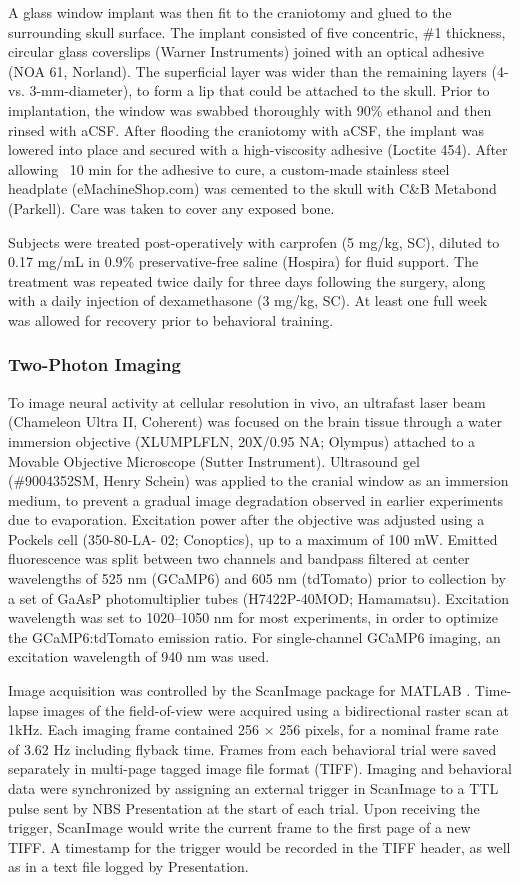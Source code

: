 {A glass window implant was then fit to the craniotomy and glued to the surrounding skull surface. The implant consisted of five concentric, \#1 thickness, circular glass coverslips (Warner Instruments) joined with an optical adhesive (NOA 61, Norland). The superficial layer was wider than the remaining layers (4- vs. 3-mm-diameter), to form a lip that could be attached to the skull. Prior to implantation, the window was swabbed thoroughly with 90\% ethanol and then rinsed with aCSF. After flooding the craniotomy with aCSF, the implant was lowered into place and secured with a high-viscosity adhesive (Loctite 454). After allowing ~10 min for the adhesive to cure, a custom-made stainless steel headplate (eMachineShop.com) was cemented to the skull with C\&B Metabond (Parkell). Care was taken to cover any exposed bone.

Subjects were treated post-operatively with carprofen (5 mg/kg, SC), diluted to 0.17 mg/mL in 0.9\% preservative-free saline (Hospira) for fluid support. The treatment was repeated twice daily for three days following the surgery, along with a daily injection of dexamethasone (3 mg/kg, SC). At least one full week was allowed for recovery prior to behavioral training.

\subsubsection*{Two-Photon Imaging}
To image neural activity at cellular resolution in vivo, an ultrafast laser beam (Chameleon Ultra II, Coherent) was focused on the brain tissue through a water immersion objective (XLUMPLFLN, 20X/0.95 NA; Olympus) attached to a Movable Objective Microscope (Sutter Instrument). Ultrasound gel (\#9004352SM, Henry Schein) was applied to the cranial window as an immersion medium, to prevent a gradual image degradation observed in earlier experiments due to evaporation.
Excitation power after the objective was adjusted using a Pockels cell (350-80-LA-
02; Conoptics), up to a maximum of 100 mW. Emitted fluorescence was split between two channels and bandpass filtered at center wavelengths of 525 nm (GCaMP6) and 605 nm (tdTomato) prior to collection by a set of GaAsP photomultiplier tubes (H7422P-40MOD; Hamamatsu). Excitation wavelength was set to 1020--1050 nm for most experiments, in order to optimize the GCaMP6:tdTomato emission ratio. For single-channel GCaMP6 imaging, an excitation wavelength of 940 nm was used.

Image acquisition was controlled by the ScanImage package for MATLAB \citep{pologruto03}. Time-lapse images of the field-of-view were acquired using a bidirectional raster scan at 1kHz. Each imaging frame contained 256 × 256 pixels, for a nominal frame rate of 3.62 Hz including flyback time. Frames from each behavioral trial were saved separately in multi-page tagged image file format (TIFF). Imaging and behavioral data were synchronized by assigning an external trigger in ScanImage to a TTL pulse sent by NBS Presentation at the start of each trial. Upon receiving the trigger, ScanImage would write the current frame to the first page of a new TIFF. A timestamp for the trigger would be recorded in the TIFF header, as well as in a text file logged by Presentation.        

}
